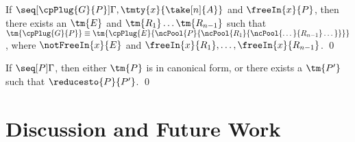 \documentclass[UKenglish]{llncs}
\begin{document}
\begin{lemma}\label{thm:nc-progress-shared}
  If $\seq[{ \cpPlug{G}{P} }]{ \Gamma, \tmty{x}{\take[n]{A}} }$ and
  $\freeIn{x}{P}$, then there exists an $\tm{E}$ and $\tm{R_1}\dots\tm{R_{n-1}}$
  such that $\tm{\cpPlug{G}{P}} \equiv
  \tm{\cpPlug{E}{\ncPool{P}{\ncPool{R_1}{\ncPool{\dots}{R_{n-1}}\dots}}}}$,
  where $\notFreeIn{x}{E}$ and $\freeIn{x}{R_1},\dots,\freeIn{x}{R_{n-1}}$.
  \qed
\end{lemma}

\begin{theorem}[Progress]\label{thm:cp-progress}
  If $\seq[{ P }]{ \Gamma }$, then either $\tm{P}$ is in canonical form, or
  there exists a $\tm{P'}$ such that $\reducesto{P}{P'}$. 
  \qed
\end{theorem}

\section{Discussion and Future Work}\label{sec:discussion}

\printbibliography
\end{document}
